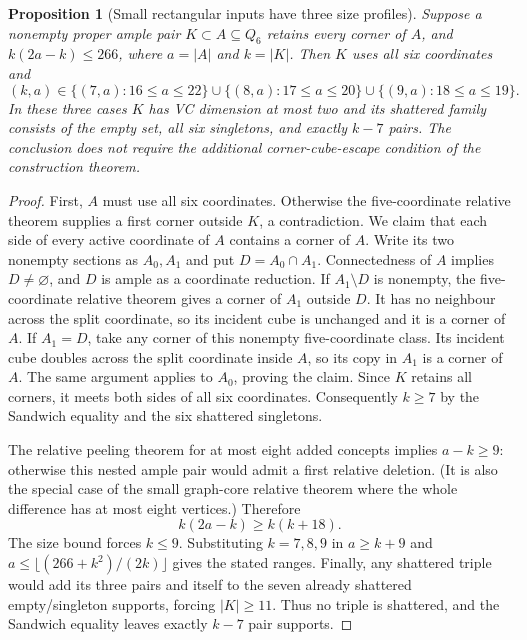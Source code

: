 \documentclass[11pt]{article}
\numberwithin{equation}{section}
\newtheorem{proposition}[theorem]{Proposition}
\theoremstyle{definition}
\theoremstyle{remark}
\begin{document}
\begin{proposition}[Small rectangular inputs have three size profiles]
\label{prop:rectangular-small-input-profiles}
Suppose a nonempty proper ample pair $K\subset A\subseteq Q_6$
retains every corner of $A$, and $k(2a-k)\le266$, where
$a=|A|$ and $k=|K|$. Then $K$ uses all six coordinates and
\[
 (k,a)\in
 \{(7,a):16\le a\le22\}\cup
 \{(8,a):17\le a\le20\}\cup
 \{(9,a):18\le a\le19\}.
\]
In these three cases $K$ has VC dimension at most two and its
shattered family consists of the empty set, all six singletons,
and exactly $k-7$ pairs. The conclusion does not require the
additional corner-cube-escape condition of the construction theorem.
\end{proposition}
\begin{proof}
First, $A$ must use all six coordinates. Otherwise the five-coordinate
relative theorem supplies a first corner outside $K$, a contradiction.
We claim that each side of every active coordinate of $A$ contains
a corner of $A$. Write its two nonempty sections as $A_0,A_1$ and
put $D=A_0\cap A_1$. Connectedness of $A$ implies $D\ne\varnothing$,
and $D$ is ample as a coordinate reduction. If $A_1\setminus D$ is
nonempty, the five-coordinate relative theorem gives a corner of
$A_1$ outside $D$. It has no neighbour across the split coordinate,
so its incident cube is unchanged and it is a corner of $A$.
If $A_1=D$, take any corner of this nonempty five-coordinate class.
Its incident cube doubles across the split coordinate inside $A$,
so its copy in $A_1$ is a corner of $A$. The same argument applies
to $A_0$, proving the claim. Since $K$ retains all corners, it meets
both sides of all six coordinates. Consequently $k\ge7$ by the
Sandwich equality and the six shattered singletons.

The relative peeling theorem for at most eight added concepts
\cite{BousquetDampReader} implies $a-k\ge9$: otherwise this nested
ample pair would admit a first relative deletion. (It is also the
special case of the small graph-core relative theorem where the
whole difference has at most eight vertices.) Therefore
\[
 k(2a-k)\ge k(k+18).
\]
The size bound forces $k\le9$. Substituting $k=7,8,9$ in
$a\ge k+9$ and $a\le\lfloor(266+k^2)/(2k)\rfloor$ gives the stated
ranges. Finally, any shattered triple would add its three pairs
and itself to the seven already shattered empty/singleton supports,
forcing $|K|\ge11$. Thus no triple is shattered, and the Sandwich
equality leaves exactly $k-7$ pair supports.
\end{proof}
\end{document}

